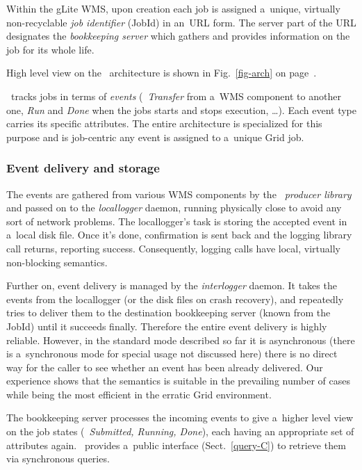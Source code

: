 Within the gLite WMS, upon creation
 each job is assigned a~unique, virtually non-recyclable
\emph{job identifier} (JobId) in an~URL form.
The server part of the URL designates the \emph{bookkeeping server} which
gathers and provides information on the job for its whole life.

High level view on the \LB\ architecture is shown in Fig.~\ref{fig-arch}
on page~\pageref{fig-arch}.

\LB\ tracks jobs in terms of \emph{events} (\eg\ \emph{Transfer} from a~WMS
component to another one, \emph{Run} and \emph{Done} when the jobs starts
and stops execution, \dots).
Each event type carries its specific attributes.
The entire architecture is specialized for this purpose and is job-centric\Dash
any event is assigned to a~unique Grid job.

\subsubsection{Event delivery and storage}
The events are gathered from various WMS components by the
\emph{\LB\ producer library}
and passed on to the \emph{locallogger} daemon,
running physically close to avoid
any sort of network problems.
The locallogger's task is storing the accepted event in a~local disk file.
Once it's done, confirmation is sent back and the logging library call
returns, reporting success.
Consequently, logging calls have local, virtually non-blocking semantics.

Further on, event delivery is managed by the \emph{interlogger} daemon.
It takes the events from the locallogger (or the disk files on crash recovery),
and repeatedly tries to deliver them to the destination
bookkeeping server (known from the JobId) until it succeeds finally.
Therefore the entire event delivery is highly reliable.
However, in the standard mode described so far it is asynchronous
(there is a~synchronous mode for special usage not discussed here)
there is no direct way for the caller to see whether an event has been
already delivered.
Our experience shows that the semantics is suitable in the prevailing number
of cases while being the most efficient in the erratic Grid environment.

The bookkeeping server processes the incoming events
to give a~higher level view
on the job states (\eg\ \emph{Submitted, Running, Done}),
each having an appropriate set of attributes again.
\LB\ provides a~public interface (Sect.~\ref{query-C})
to retrieve them via synchronous queries.

